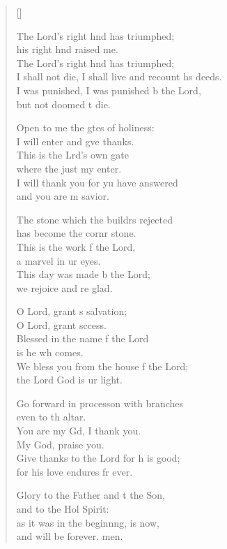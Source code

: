 \begin{verse}[\versewidth]
\begin{patverse}
    The Lord’s right hnd has triumphed;\Med\\
    his right hnd raised me.\\
    The Lord’s right hnd has triumphed;\Med\\
    I shall not die, I shall live and recount h\pointup{\i}s deeds.\\
    I was punished, I was punished b the Lord,\Med\\
    but not doomed t die.

    Open to me the gtes of holiness:\Med\\
    I will enter and g\pointup{\i}ve thanks.\\
    This is the Lrd’s own gate\Med\\
    where the just my enter.\\
    I will thank you for yu have answered\Med\\
    and you are m savior.

    The stone which the buildrs rejected\Med\\
    has become the cornr stone.\\
    This is the work f the Lord,\Med\\
    a marvel in ur eyes.\\
    This day was made b the Lord;\Med\\
    we rejoice and re glad.

    O Lord, grant s salvation;\Med\\
    O Lord, grant sccess.\\
    Blessed in the name f the Lord\Med\\
    is he wh comes.\\
    We bless you from the house f the Lord;\Med\\
    the Lord God is ur light.

    Go forward in process\pointup{\i}on with branches\Med\\
    even to th altar.\\
    You are my Gd, I thank you.\Med\\
    My God,  praise you.\\
    Give thanks to the Lord for h is good;\Med\\
    for his love endures fr ever.

    Glory to the Father and t the Son,\Med\\
    and to the Hol Spirit:\\
    as it was in the beginn\pointup{\i}ng, is now,\Med\\
    and will be forever. men.
  \end{patverse}
\end{verse}
